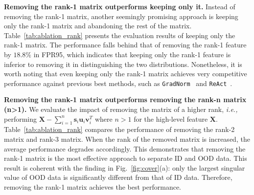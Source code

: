 \noindent \textbf{Removing the rank-1 matrix outperforms keeping only it.} Instead of removing the rank-1 matrix, another seemingly promising approach is keeping only the rank-1 matrix and abandoning the rest of the matrix. Table~\ref{tab:ablation_rank} presents the evaluation results of keeping only the rank-1 matrix. The performance falls behind that of removing the rank-1 feature by $18.8\%$ in FPR95, which indicates that keeping only the rank-1 feature is inferior to removing it in distinguishing the two distributions. Nonetheless, it is worth noting that even keeping only the rank-1 matrix achieves very competitive performance against previous best methods, such as \texttt{GradNorm}~\cite{huang2021importance} and \texttt{ReAct}~\cite{sun2021react}.

\noindent \textbf{Removing the rank-1 matrix outperforms removing the rank-n matrix (n>1).} We evaluate the impact of removing the matrix of a higher rank, \emph{i.e.,} performing $\mathbf{X}{-}\sum_{i=1}^{n}\mathbf{s}_{i}\mathbf{u}_{i}\mathbf{v}_{i}^{T}$ where $n{>}1$ for the high-level feature $\mathbf{X}$. Table~\ref{tab:ablation_rank} compares the performance of removing the rank-2 matrix and rank-3 matrix. When the rank of the removed matrix is increased, the average performance degrades accordingly. This demonstrates that removing the rank-1 matrix is the most effective approach to separate ID and OOD data. This result is coherent with the finding in Fig.~\ref{fig:cover}(a): only the largest singular value of OOD data is significantly different from that of ID data. Therefore, removing the rank-1 matrix achieves the best performance.  

